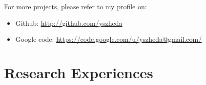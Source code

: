 \documentclass[letterpaper]{article}
\begin{document}
\begin{itemize}
\end{itemize}

For more projects, please refer to my profile on:
\begin{itemize}
    \item Github: \url{http://github.com/yszheda} 
    \item Google code: \url{https://code.google.com/u/yszheda@gmail.com/}
\end{itemize}


\section*{Research Experiences}
\end{document}
